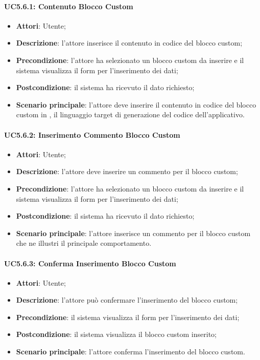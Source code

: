 \paragraph{UC5.6.1: Contenuto Blocco Custom}
\label{UC5.6.1}
\begin{itemize}
	\item \textbf{Attori}: Utente;
	\item \textbf{Descrizione}: l'attore inserisce il contenuto in codice del blocco custom;
	\item \textbf{Precondizione}: l'attore ha selezionato un blocco custom da inserire e il sistema visualizza il form per l'inserimento dei dati;
	\item \textbf{Postcondizione}: il sistema ha ricevuto il dato richiesto;
	\item \textbf{Scenario principale}: l'attore deve inserire il contenuto in codice del blocco custom in , il linguaggio target di generazione del codice dell'applicativo.
\end{itemize}

\paragraph{UC5.6.2: Inserimento Commento Blocco Custom}
\label{UC5.6.2}
\begin{itemize}
	\item \textbf{Attori}: Utente;
	\item \textbf{Descrizione}: l'attore deve inserire un commento per il blocco custom;
	\item \textbf{Precondizione}: l'attore ha selezionato un blocco custom da inserire e il sistema visualizza il form per l'inserimento dei dati;
	\item \textbf{Postcondizione}: il sistema ha ricevuto il dato richiesto;
	\item \textbf{Scenario principale}: l'attore inserisce un commento per il blocco custom che ne illustri il principale comportamento.
\end{itemize}

\paragraph{UC5.6.3: Conferma Inserimento Blocco Custom}
\label{UC5.6.3}
\begin{itemize}
	\item \textbf{Attori}: Utente;
	\item \textbf{Descrizione}: l'attore può confermare l'inserimento del blocco custom;
	\item \textbf{Precondizione}: il sistema visualizza il form per l'inserimento dei dati;
	\item \textbf{Postcondizione}: il sistema visualizza il blocco custom inserito;
	\item \textbf{Scenario principale}: l'attore conferma l'inserimento del blocco custom.
\end{itemize}

